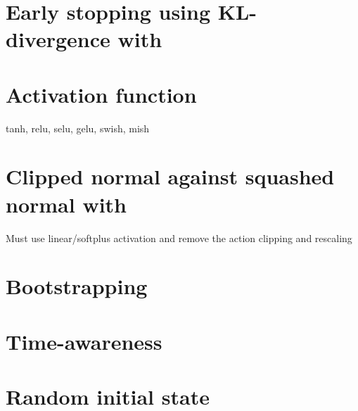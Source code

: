 \section{Early stopping using KL-divergence with \ppo}

\section{Activation function}

tanh, relu, selu, gelu, swish, mish

\section{Clipped normal against squashed normal with \ppo}

Must use linear/softplus activation and remove the action clipping and rescaling

\section{Bootstrapping}

\section{Time-awareness}

\section{Random initial state}

